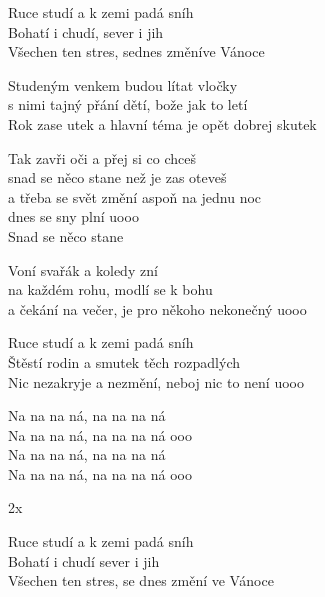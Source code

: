 
\ve{}
Ruce studí a k zemi padá sníh\\
Bohatí i chudí, sever i jih\\
Všechen ten stres, sednes změníve Vánoce

\ve{}
Studeným venkem budou lítat vločky\\
s nimi tajný přání dětí, bože jak to letí\\
Rok zase utek a hlavní téma je opět dobrej skutek

\cho{}
Tak zavři oči a přej si co chceš\\
snad se něco stane než je zas oteveš\\
a třeba se svět změní aspoň na jednu noc\\
dnes se sny plní uooo\\
Snad se něco stane

\ve{}
Voní svařák a koledy zní\\
na každém rohu, modlí se k bohu\\
a čekání na večer, je pro někoho nekonečný uooo

\ve{}
Ruce studí a k zemi padá sníh\\
Štěstí rodin a smutek těch rozpadlých\\
Nic nezakryje a nezmění, neboj nic to není uooo

\cho{}

\ve{}
Na na na ná, na na na ná\\
Na na na ná, na na na ná ooo \\
Na na na ná, na na na ná\\
Na na na ná, na na na ná ooo

\cho{}
2x

\ve{}
Ruce studí a k zemi padá sníh\\
Bohatí i chudí sever i jih\\
Všechen ten stres, se dnes změní ve Vánoce

\esong{}
